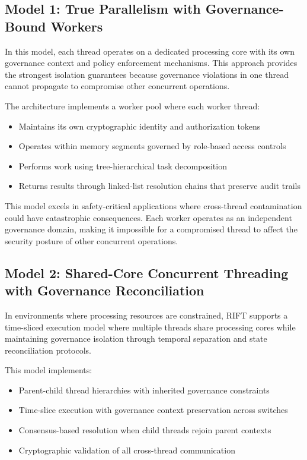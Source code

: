 \subsection*{Model 1: True Parallelism with Governance-Bound Workers}

In this model, each thread operates on a dedicated processing core with its own governance context and policy enforcement mechanisms. This approach provides the strongest isolation guarantees because governance violations in one thread cannot propagate to compromise other concurrent operations.

The architecture implements a worker pool where each worker thread:
\begin{itemize}
\item Maintains its own cryptographic identity and authorization tokens
\item Operates within memory segments governed by role-based access controls  
\item Performs work using tree-hierarchical task decomposition
\item Returns results through linked-list resolution chains that preserve audit trails
\end{itemize}

This model excels in safety-critical applications where cross-thread contamination could have catastrophic consequences. Each worker operates as an independent governance domain, making it impossible for a compromised thread to affect the security posture of other concurrent operations.

\subsection*{Model 2: Shared-Core Concurrent Threading with Governance Reconciliation}

In environments where processing resources are constrained, RIFT supports a time-sliced execution model where multiple threads share processing cores while maintaining governance isolation through temporal separation and state reconciliation protocols.

This model implements:
\begin{itemize}
\item Parent-child thread hierarchies with inherited governance constraints
\item Time-slice execution with governance context preservation across switches
\item Consensus-based resolution when child threads rejoin parent contexts  
\item Cryptographic validation of all cross-thread communication
\end{itemize}

